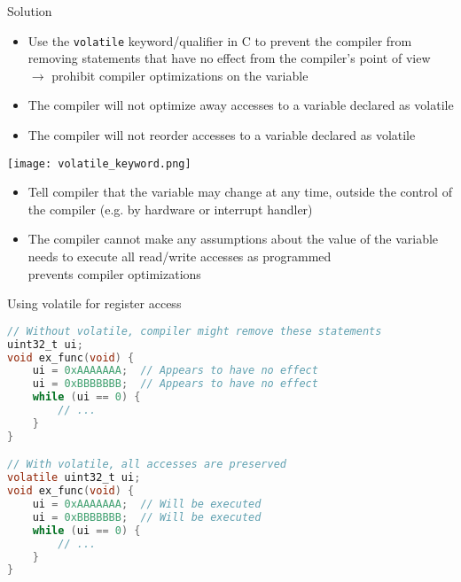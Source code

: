 \begin{theorem}{Solution}
    \begin{itemize}
        \item Use the \texttt{volatile} keyword/qualifier in C to prevent the compiler from removing statements that have no effect from the compiler's point of view\\
        $\rightarrow$ prohibit compiler optimizations on the variable\\
        \item The compiler will not optimize away accesses to a variable declared as volatile
        \item The compiler will not reorder accesses to a variable declared as volatile
    \end{itemize}
    \texttt{[image: volatile\_keyword.png]}
    \begin{itemize}
        \item Tell compiler that the variable may change at any time, outside the control of the compiler (e.g. by hardware or interrupt handler)
        \item The compiler cannot make any assumptions about the value of the variable\\
        needs to execute all read/write accesses as programmed\\
        prevents compiler optimizations
    \end{itemize}
\end{theorem}

\begin{code}{Using volatile for register access}
\begin{lstlisting}[language=C, style=basesmol]
// Without volatile, compiler might remove these statements
uint32_t ui;
void ex_func(void) {
    ui = 0xAAAAAAA;  // Appears to have no effect
    ui = 0xBBBBBBB;  // Appears to have no effect
    while (ui == 0) {
        // ...
    }
}

// With volatile, all accesses are preserved
volatile uint32_t ui;
void ex_func(void) {
    ui = 0xAAAAAAA;  // Will be executed
    ui = 0xBBBBBBB;  // Will be executed
    while (ui == 0) {
        // ...
    }
}
\end{lstlisting}
\end{code}

